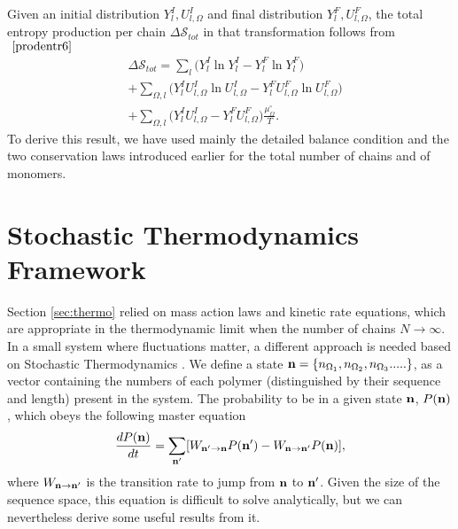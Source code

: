 \documentclass[
	amsmath,
	amssymb,
	a4paper,
	aip,		%
	jcp,		%
	reprint, twocolumn  %
	fleqn,
	showpacs,
	floatfix
]{revtex4-1}
\begin{document}
Given an initial distribution 
$Y^{I}_{l}, U^{I}_{l,\Omega} $ and final distribution 
$Y^{F}_{l}, U^{F}_{l,\Omega}$, the total entropy production per chain $\Delta \mathcal{S}_{tot}$ in that transformation 
follows from $~\eqref{prodentr6}$
\begin{equation}
	\begin{split}
&  \Delta \mathcal{S}_{tot} =   \sum_{ l} \Big( Y^{I}_{l} \ln Y^{I}_{l} - Y^{F}_{l} \ln Y^{F}_{l} \Big)  
\label{prodentrint}  \\
&+  \sum_{\Omega, l } \Big( Y^{I}_{l} U^{I}_{l,\Omega} \ln  U^{I}_{l,\Omega}   -Y^{F}_{l} U^{F}_{l, \Omega} \ln U^{F}_{l, \Omega}  \Big)  \\ 
&+ \sum_{\Omega,l} \Big( Y^{I}_{l}  U^{I}_{l,\Omega} - Y^{F}_{l} U^{F}_{l, \Omega} \Big)   \frac{\mu^{\circ}_{\Omega}}{T}.
\end{split} 
\end{equation}
To derive this result, we have used mainly the detailed balance condition and the two conservation laws 
introduced earlier for the total number of chains and of monomers.


\section{Stochastic Thermodynamics Framework}
\label{sec:thermo_stoc}
Section \ref{sec:thermo} relied on mass action laws and kinetic rate equations, which are appropriate in the thermodynamic limit 
when the number of chains $N \rightarrow \infty$. In a small system where fluctuations matter, a different approach 
is needed based on Stochastic Thermodynamics \cite{Decker2015,Esposito201,Seifert2012}. 
We define a state $\bold{n}=\{n_{\Omega_{1}}, n_{\Omega_{2}}, n_{\Omega_{3}} ..... \}$, as a vector containing the numbers of 
each polymer (distinguished by their sequence and length) present in the system. 
The probability to be in a given state $\bold{n}$, $P(\bold{n})$, which obeys the following 
master equation \cite{Gaspard2004_vol120} 
\begin{equation}
	\begin{split}
\frac{d P( \bold{n})}{dt} =\sum_{\bold{n'}}   [ W_{\bold{n'} \rightarrow  \bold{n}} P(\bold{n'}) -  W_{\bold{n} \rightarrow  \bold{n'}} P(\bold{n})],
\label{Mastereq}
\end{split} 
\end{equation}
where $W_{\bold{n} \rightarrow  \bold{n'}}$ is the transition rate to jump from $\bold{n}$ to $\bold{n'}$. 
Given the size of the sequence space, this equation is difficult to solve analytically, but we can nevertheless derive some useful 
results from it.
\end{document}
